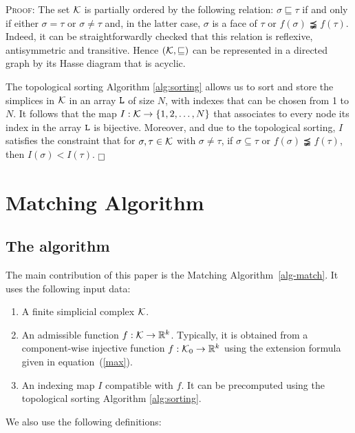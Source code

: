 \documentclass[12pt]{article}
\newenvironment{proof}{\noindent\textsc{Proof: }}{\hfill$\fbox{}$\par\medskip\par}
\newcommand{\R}{{\mathbb R}}
\newcommand{\cK}{{\cal K}}
\begin{document}
\begin{proof}
The set ${\cK}$ is partially ordered by the following relation: $\sigma \sqsubseteq \tau$ if and only if either
$\sigma=\tau$ or $\sigma\ne \tau$ and, in the latter case, $\sigma$ is a face of $\tau$ or  $f(\sigma)\precneqq  f(\tau)$.
Indeed, it can be straightforwardly checked that this relation is reflexive, antisymmetric and transitive.
Hence $({\cK}, \sqsubseteq)$ can be represented in a directed graph by its Hasse diagram that is acyclic.

The topological sorting Algorithm \ref{alg:sorting}  allows us to sort and store the simplices
in $\cK$ in an array $\texttt{L}$ of size $N$, with indexes that can be chosen from 1 to $N$. It follows that the map $I:{\cK} \to \{1,2,\ldots,N\}$ that
associates to every node its index in the array $\texttt{L}$ is bijective. Moreover, and due to the topological sorting, $I$ satisfies the constraint
that for $\sigma, \tau \in {\cK}$ with $\sigma \ne \tau$, if $\sigma\subseteq \tau$ or $f(\sigma)\precneqq  f(\tau)$, then $I(\sigma)<I(\tau)$.
\end{proof}

\section{Matching Algorithm}
\label{sec:alg}

\subsection{The algorithm}

The main contribution of this paper is the Matching Algorithm~\ref{alg-match}.
It uses the following input data:

\begin{enumerate}
\item A finite simplicial complex $\cK$.

\item An admissible function $f:\cK\to \R^k$. Typically, it is obtained from a component-wise injective function $f : {\cK}_0 \to \R^k$   using  the extension formula given in equation~(\ref{max}).

\item An indexing map $I$ compatible with $f$. It can be precomputed using the topological sorting Algorithm \ref{alg:sorting}.
\end{enumerate}

We also use the following definitions:
\end{document}
